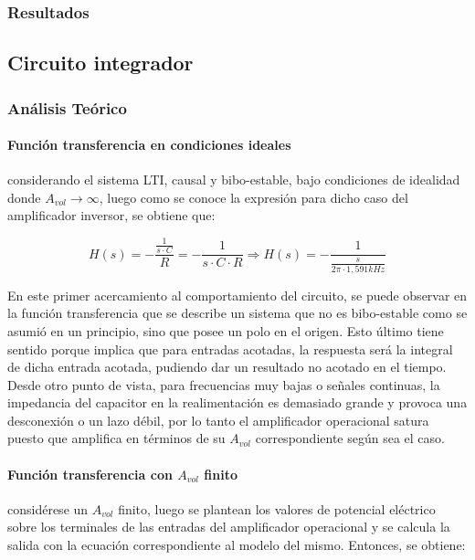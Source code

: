 \subsubsection{Resultados}


	\subsection{Circuito integrador}

\subsubsection{An\'alisis Te\'orico}

\paragraph*{Funci\'on transferencia en condiciones ideales} considerando el sistema LTI, causal y bibo-estable, bajo condiciones de idealidad donde $A_{vol} \rightarrow \infty$, luego como se conoce la expresi\'on para dicho caso del amplificador inversor, se obtiene que:

\begin{equation}
	H(s) = - \frac{\frac{1}{s \cdot C}}{R} = - \frac{1}{s \cdot C \cdot R}
	\Rightarrow
	H(s) = - \frac{1}{\frac{s}{2 \pi \cdot 1,591kHz}}
	\label{eq:integrador_transfer_ideal}
\end{equation}

En este primer acercamiento al comportamiento del circuito, se puede observar en la funci\'on transferencia que se describe un sistema que no es bibo-estable como se asumi\'o en un principio, sino que posee un polo en el origen. Esto \'ultimo tiene sentido porque implica que para entradas acotadas, la respuesta ser\'a la integral de dicha entrada acotada, pudiendo dar un resultado no acotado en el tiempo. Desde otro punto de vista, para frecuencias muy bajas o se\~nales continuas, la impedancia del capacitor en la realimentaci\'on es demasiado grande y provoca una desconexi\'on o un lazo d\'ebil, por lo tanto el amplificador operacional satura puesto que amplifica en t\'erminos de su $A_{vol}$ correspondiente seg\'un sea el caso.

\paragraph*{Funci\'on transferencia con $A_{vol}$ finito} consid\'erese un $A_{vol}$ finito, luego se plantean los valores de potencial el\'ectrico sobre los terminales de las entradas del amplificador operacional y se calcula la salida con la ecuaci\'on correspondiente al modelo del mismo. Entonces, se obtiene:

